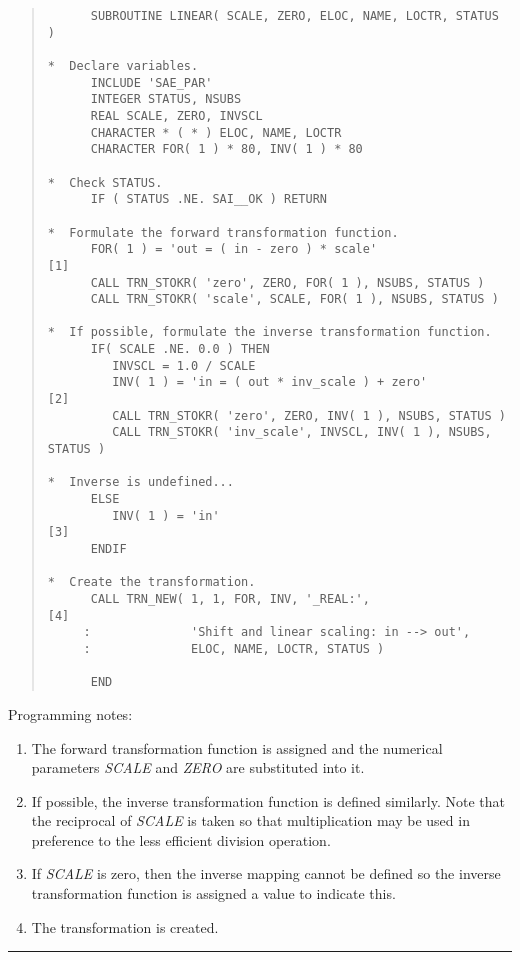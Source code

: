 \documentclass[twoside,11pt]{article}
\renewcommand{\_}{\texttt{\symbol{95}}}
\newcommand{\fortvar}[1]{\mbox{\emph{#1}}}
\newcommand{\exampledone}[0]{\begin{center} \rule{6em}{0.2mm} \end{center}}
\begin{document}
\begin{quote}
\begin{verbatim}
      SUBROUTINE LINEAR( SCALE, ZERO, ELOC, NAME, LOCTR, STATUS )

*  Declare variables.
      INCLUDE 'SAE_PAR'
      INTEGER STATUS, NSUBS
      REAL SCALE, ZERO, INVSCL
      CHARACTER * ( * ) ELOC, NAME, LOCTR
      CHARACTER FOR( 1 ) * 80, INV( 1 ) * 80

*  Check STATUS.
      IF ( STATUS .NE. SAI__OK ) RETURN

*  Formulate the forward transformation function.
      FOR( 1 ) = 'out = ( in - zero ) * scale'                 [1]
      CALL TRN_STOKR( 'zero', ZERO, FOR( 1 ), NSUBS, STATUS )
      CALL TRN_STOKR( 'scale', SCALE, FOR( 1 ), NSUBS, STATUS )

*  If possible, formulate the inverse transformation function.
      IF( SCALE .NE. 0.0 ) THEN
         INVSCL = 1.0 / SCALE
         INV( 1 ) = 'in = ( out * inv_scale ) + zero'          [2]
         CALL TRN_STOKR( 'zero', ZERO, INV( 1 ), NSUBS, STATUS )
         CALL TRN_STOKR( 'inv_scale', INVSCL, INV( 1 ), NSUBS, STATUS )

*  Inverse is undefined...
      ELSE
         INV( 1 ) = 'in'                                       [3]
      ENDIF

*  Create the transformation.
      CALL TRN_NEW( 1, 1, FOR, INV, '_REAL:',                  [4]
     :              'Shift and linear scaling: in --> out',
     :              ELOC, NAME, LOCTR, STATUS )

      END

\end{verbatim}
\end{quote}

Programming notes:

\begin{enumerate}

\item The forward transformation function is assigned and the numerical
parameters \fortvar{SCALE} and \fortvar{ZERO} are substituted into it.

\item If possible, the inverse transformation function is defined similarly.
Note that the reciprocal of \fortvar{SCALE} is taken so that multiplication
may be used in preference to the less efficient division operation.

\item If \fortvar{SCALE} is zero, then the inverse mapping cannot be defined
so the inverse transformation function is assigned a value to indicate this.

\item The transformation is created.

\end{enumerate}
\exampledone
\end{document}
